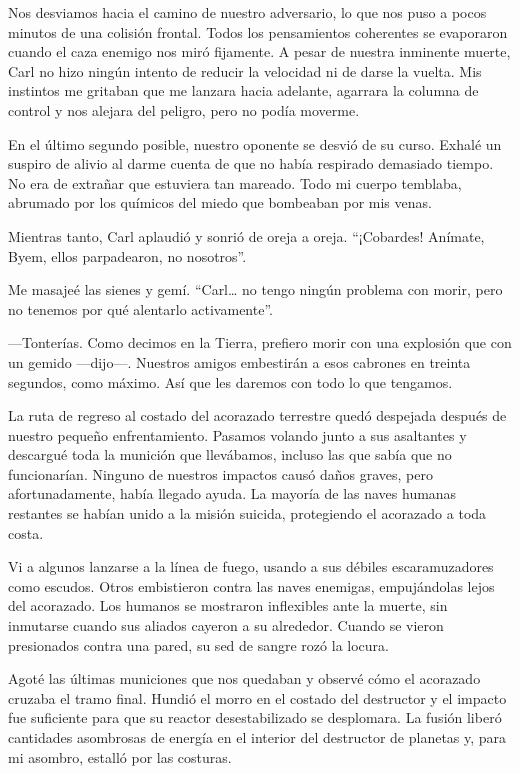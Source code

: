 Nos desviamos hacia el camino de nuestro adversario, lo que nos puso a pocos minutos de una colisión frontal. Todos los pensamientos coherentes se evaporaron cuando el caza enemigo nos miró fijamente. A pesar de nuestra inminente muerte, Carl no hizo ningún intento de reducir la velocidad ni de darse la vuelta. Mis instintos me gritaban que me lanzara hacia adelante, agarrara la columna de control y nos alejara del peligro, pero no podía moverme.

En el último segundo posible, nuestro oponente se desvió de su curso. Exhalé un suspiro de alivio al darme cuenta de que no había respirado demasiado tiempo. No era de extrañar que estuviera tan mareado. Todo mi cuerpo temblaba, abrumado por los químicos del miedo que bombeaban por mis venas.

Mientras tanto, Carl aplaudió y sonrió de oreja a oreja. ``¡Cobardes! Anímate, Byem, ellos parpadearon, no nosotros''.

Me masajeé las sienes y gemí. ``Carl… no tengo ningún problema con morir, pero no tenemos por qué alentarlo activamente''.

—Tonterías. Como decimos en la Tierra, prefiero morir con una explosión que con un gemido —dijo—. Nuestros amigos embestirán a esos cabrones en treinta segundos, como máximo. Así que les daremos con todo lo que tengamos.

La ruta de regreso al costado del acorazado terrestre quedó despejada después de nuestro pequeño enfrentamiento. Pasamos volando junto a sus asaltantes y descargué toda la munición que llevábamos, incluso las que sabía que no funcionarían. Ninguno de nuestros impactos causó daños graves, pero afortunadamente, había llegado ayuda. La mayoría de las naves humanas restantes se habían unido a la misión suicida, protegiendo el acorazado a toda costa.

Vi a algunos lanzarse a la línea de fuego, usando a sus débiles escaramuzadores como escudos. Otros embistieron contra las naves enemigas, empujándolas lejos del acorazado. Los humanos se mostraron inflexibles ante la muerte, sin inmutarse cuando sus aliados cayeron a su alrededor. Cuando se vieron presionados contra una pared, su sed de sangre rozó la locura.

Agoté las últimas municiones que nos quedaban y observé cómo el acorazado cruzaba el tramo final. Hundió el morro en el costado del destructor y el impacto fue suficiente para que su reactor desestabilizado se desplomara. La fusión liberó cantidades asombrosas de energía en el interior del destructor de planetas y, para mi asombro, estalló por las costuras.

